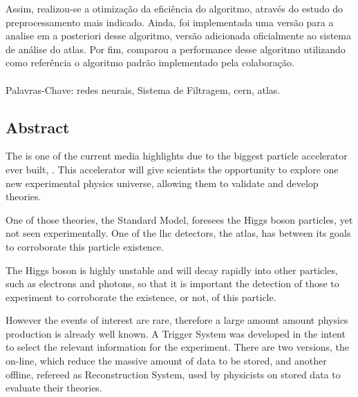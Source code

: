 Assim, realizou-se a otimização da eficiência do algoritmo, 
através do estudo do preprocessamento mais indicado. 
Ainda, foi implementada uma versão para a analise em 
a posteriori desse algoritmo, versão adicionada oficialmente ao
sistema de análise do \gls{atlas}. Por fim, comparou a performance desse algoritmo 
utilizando como referência o algoritmo padrão implementado pela colaboração.

\paragraph{}

\noindent Palavras-Chave:  redes neurais, Sistema de Filtragem, \acrshort{cern},
  \acrshort{atlas}.

\vfill

\cleardoublepage

\vfill
\begin{center}
\section*{Abstract\label{Abstract}}
\end{center}

The  is one of the current
media highlights due to the biggest particle accelerator ever built, . This accelerator will give scientists the opportunity to explore 
one new experimental physics universe, allowing them to validate and develop
theories.

One of those theories, the Standard Model, foresees the Higgs boson particles,
yet not seen experimentally. One of the \acrshort{lhc} detectors, the
\gls{atlas}, has between its goals to corroborate this particle existence.

The Higgs boson is highly unstable and will decay rapidly into other particles,
such as electrons and photons, so that it is important the detection of those to
experiment to corroborate the existence, or not, of this particle.

However the events of interest are rare, therefore a large amount amount physics
production is already well known. A Trigger System was developed in the
intent to select the relevant information for the experiment. There are two
versions, the on-line, which reduce the massive amount of data
to be stored, and another offline, refereed as Reconstruction System, used by 
physicists on stored data to evaluate their theories.

